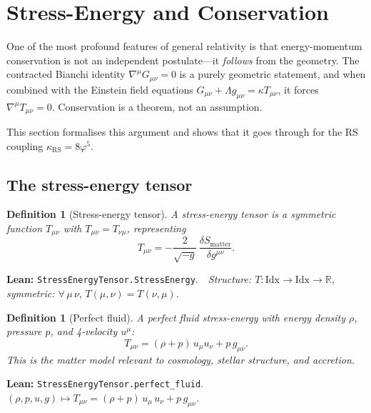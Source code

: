 \documentclass[11pt,a4paper]{article}
\newtheorem{definition}[theorem]{Definition}
\newcommand{\vp}{\varphi}
\newcommand{\kRS}{\kappa_{\mathrm{RS}}}
\newcommand{\RR}{\mathbb{R}}
\newcommand{\lean}[1]{\texttt{#1}}
\newcommand{\leanref}[2]{\noindent\textbf{Lean:} \lean{#1}.\ \ \textit{#2}}
\begin{document}
\section{Stress-Energy and Conservation}
\label{sec:stress}

One of the most profound features of general relativity is that energy-momentum conservation is not an independent postulate---it \emph{follows} from the geometry.
The contracted Bianchi identity $\nabla^\mu G_{\mu\nu} = 0$ is a purely geometric statement, and when combined with the Einstein field equations $G_{\mu\nu} + \Lambda g_{\mu\nu} = \kappa T_{\mu\nu}$, it forces $\nabla^\mu T_{\mu\nu} = 0$.
Conservation is a theorem, not an assumption.

This section formalises this argument and shows that it goes through for the RS coupling $\kRS = 8\vp^5$.

\subsection{The stress-energy tensor}

\begin{definition}[Stress-energy tensor]
\label{def:stress}
A \emph{stress-energy tensor} is a symmetric function $T_{\mu\nu}$ with $T_{\mu\nu} = T_{\nu\mu}$, representing
\begin{equation}\label{eq:stress_def}
T_{\mu\nu} = -\frac{2}{\sqrt{-g}}\,\frac{\delta S_{\mathrm{matter}}}{\delta g^{\mu\nu}}.
\end{equation}
\end{definition}

\leanref{StressEnergyTensor.StressEnergy}{Structure: $T : \mathrm{Idx} \to \mathrm{Idx} \to \RR$, symmetric: $\forall\,\mu\,\nu,\, T(\mu,\nu) = T(\nu,\mu)$.}

\begin{definition}[Perfect fluid]
\label{def:perfect_fluid}
A perfect fluid stress-energy with energy density $\rho$, pressure $p$, and 4-velocity $u^\mu$:
\begin{equation}\label{eq:perfect_fluid}
T_{\mu\nu} = (\rho + p)\,u_\mu u_\nu + p\,g_{\mu\nu}.
\end{equation}
This is the matter model relevant to cosmology, stellar structure, and accretion.
\end{definition}

\leanref{StressEnergyTensor.perfect\_fluid}{$(\rho, p, u, g) \mapsto T_{\mu\nu} = (\rho+p)\,u_\mu\,u_\nu + p\,g_{\mu\nu}$.}
\end{document}
